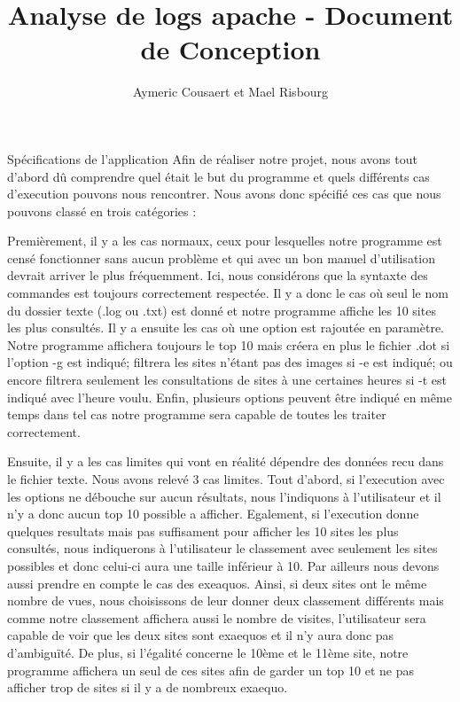 \documentclass{article}
\date{}
\title{Analyse de logs apache - Document de Conception}
\author{Aymeric Cousaert et Mael Risbourg}
\begin{document}
\maketitle

\vspace{1cm}
\tableofcontents
\vspace{1cm}

\begin{section}{Spécifications de l'application}
Afin de réaliser notre projet, nous avons tout d'abord dû comprendre quel était le but du programme et quels différents cas d'execution pouvons nous rencontrer. Nous avons donc spécifié ces cas  que nous pouvons classé en trois catégories :

Premièrement, il y a les cas normaux, ceux pour lesquelles notre programme est censé fonctionner sans aucun problème et qui avec un bon manuel d'utilisation devrait arriver le plus fréquemment. Ici, nous considérons que la syntaxte des commandes est toujours correctement respectée. Il y a donc le cas où seul le nom du dossier texte (.log ou .txt) est donné et notre programme affiche les 10 sites les plus consultés. Il y a ensuite les cas où une option est rajoutée en paramètre. Notre programme affichera toujours le top 10 mais créera en plus le fichier .dot si l'option -g est indiqué; filtrera les sites n'étant pas des images si -e est indiqué; ou encore filtrera seulement les consultations de sites à une certaines heures si -t est indiqué avec l'heure voulu. Enfin, plusieurs options peuvent être indiqué en même temps dans tel cas notre programme sera capable de toutes les traiter correctement.

Ensuite, il y a les cas limites qui vont en réalité dépendre des données recu dans le fichier texte. Nous avons relevé 3 cas limites. Tout d'abord, si l'execution avec les options ne débouche sur aucun résultats, nous l'indiquons à l'utilisateur et il n'y a donc aucun top 10 possible a afficher. Egalement, si l'execution donne quelques resultats mais pas suffisament pour afficher les 10 sites les plus consultés, nous indiquerons à l'utilisateur le classement avec seulement les sites possibles et donc celui-ci aura une taille inférieur à 10. Par ailleurs nous devons aussi prendre en compte le cas des exeaquos. Ainsi, si deux sites ont le même nombre de vues, nous choisissons de leur donner deux classement différents mais comme notre classement affichera aussi le nombre de visites, l'utilisateur sera capable de voir que les deux sites sont exaequos et il n'y aura donc pas d'ambiguïté. De plus, si l'égalité concerne le 10ème et le 11ème site, notre programme affichera un seul de ces sites afin de garder un top 10 et ne pas afficher trop de sites si il y a de nombreux exaequo.



\end{section}
\end{document}
